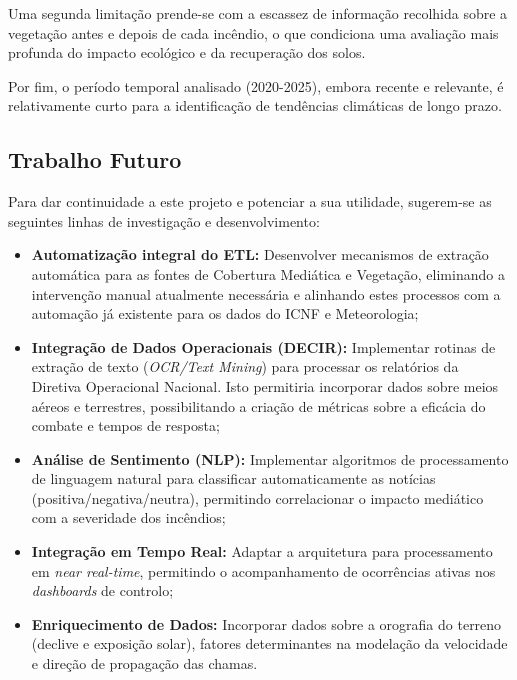 Uma segunda limitação prende-se com a escassez de informação recolhida sobre a vegetação antes e depois de cada incêndio, o que condiciona uma avaliação mais profunda do impacto ecológico e da recuperação dos solos.

Por fim, o período temporal analisado (2020-2025), embora recente e relevante, é relativamente curto para a identificação de tendências climáticas de longo prazo.

\subsection{Trabalho Futuro}
Para dar continuidade a este projeto e potenciar a sua utilidade, sugerem-se as seguintes linhas de investigação e desenvolvimento:

\begin{itemize}
	\item \textbf{Automatização integral do ETL:} Desenvolver mecanismos de extração automática para as fontes de Cobertura Mediática e Vegetação, eliminando a intervenção manual atualmente necessária e alinhando estes processos com a automação já existente para os dados do ICNF e Meteorologia;
	\item \textbf{Integração de Dados Operacionais (DECIR):} Implementar rotinas de extração de texto (\textit{OCR/Text Mining}) para processar os relatórios da Diretiva Operacional Nacional. Isto permitiria incorporar dados sobre meios aéreos e terrestres, possibilitando a criação de métricas sobre a eficácia do combate e tempos de resposta;
	\item \textbf{Análise de Sentimento (NLP):} Implementar algoritmos de processamento de linguagem natural para classificar automaticamente as notícias (positiva/negativa/neutra), permitindo correlacionar o impacto mediático com a severidade dos incêndios;
	\item \textbf{Integração em Tempo Real:} Adaptar a arquitetura para processamento em \textit{near real-time}, permitindo o acompanhamento de ocorrências ativas nos \textit{dashboards} de controlo;
	\item \textbf{Enriquecimento de Dados:} Incorporar dados sobre a orografia do terreno (declive e exposição solar), fatores determinantes na modelação da velocidade e direção de propagação das chamas.
\end{itemize}
